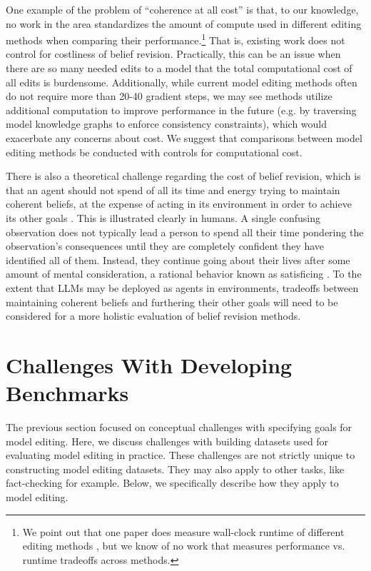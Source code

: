 \documentclass[11pt,a4paper]{article}
\begin{document}
One example of the problem of ``coherence at all cost'' is that, to our knowledge, no work in the area standardizes the amount of compute used in different editing methods when comparing their performance.\footnote{We point out that one paper does measure wall-clock runtime of different editing methods \citep{hartvigsen2023aging}, but we know of no work that measures performance vs. runtime tradeoffs across methods.} That is, existing work does not control for costliness of belief revision. Practically, this can be an issue when there are so many needed edits to a model that the total computational cost of all edits is burdensome. Additionally, while current model editing methods often do not require more than 20-40 gradient steps, we may see methods utilize additional computation to improve performance in the future (e.g. by traversing model knowledge graphs to enforce consistency constraints), which would exacerbate any concerns about cost. We suggest that comparisons between model editing methods be conducted with controls for computational cost.

There is also a theoretical challenge regarding the cost of belief revision, which is that an agent should not spend of all its time and energy trying to maintain coherent beliefs, at the expense of acting in its environment in order to achieve its other goals \citep{sep-epistemology-bayesian}. This is illustrated clearly in humans. A single confusing observation does not typically lead a person to spend all their time pondering the observation's consequences until they are completely confident they have identified all of them. Instead, they continue going about their lives after some amount of mental consideration, a rational behavior known as satisficing \citep{simon1956rational}. To the extent that LLMs may be deployed as agents in environments, tradeoffs between maintaining coherent beliefs and furthering their other goals will need to be considered for a more holistic evaluation of belief revision methods.

\section{Challenges With Developing Benchmarks}
\label{sec:challenges_benchmarks}

The previous section focused on conceptual challenges with specifying goals for model editing. Here, we discuss challenges with building datasets used for evaluating model editing in practice. These challenges are not strictly unique to constructing model editing datasets. They may also apply to other tasks, like fact-checking for example. Below, we specifically describe how they apply to model editing.
\end{document}
